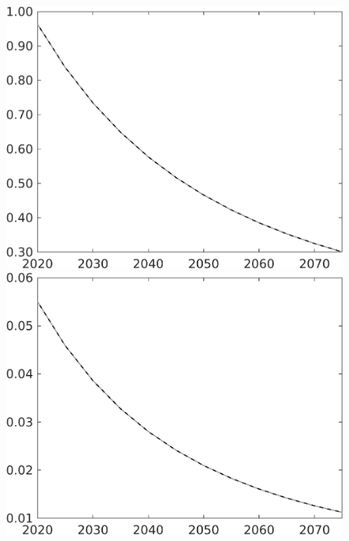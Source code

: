 \documentclass[12pt]{article}
\begin{document}
\begin{figure}[h!!]
\begin{minipage}[]{0.32\textwidth}
	\end{minipage}	
	\begin{minipage}[]{0.32\textwidth}
		\includegraphics[width=1\textwidth]{../../codding_model/own_basedOnFried/optimalPol_010922_revision/figures/all_13Sept22/CompTaul_Equlab_LFBAU_Reg0_pg_spillover0_nsk1_xgr0_knspil1_sep1_countec0_GovRev0_etaa0.79_lgd0.png}
	\end{minipage}	
	\begin{minipage}[]{0.32\textwidth}
		\includegraphics[width=1\textwidth]{../../codding_model/own_basedOnFried/optimalPol_010922_revision/figures/all_13Sept22/CompTaul_Equlab_LFBAU_Reg0_pepn_spillover0_nsk1_xgr0_knspil1_sep1_countec0_GovRev0_etaa0.79_lgd0.png}

\end{minipage}
\end{figure}
\end{document}
